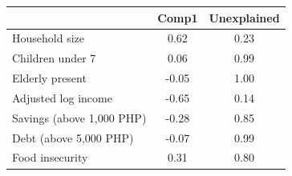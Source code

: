 \begin{tabular}{lcc}
\toprule
 & Comp1 & Unexplained \\
\midrule
Household size &  0.62 &  0.23 \\
Children under 7 &  0.06 &  0.99 \\
Elderly present & -0.05 &  1.00 \\
Adjusted log income & -0.65 &  0.14 \\
Savings (above 1{,}000 PHP) & -0.28 &  0.85 \\
Debt (above 5{,}000 PHP) & -0.07 &  0.99 \\
Food insecurity &  0.31 &  0.80 \\
\bottomrule
\end{tabular}
